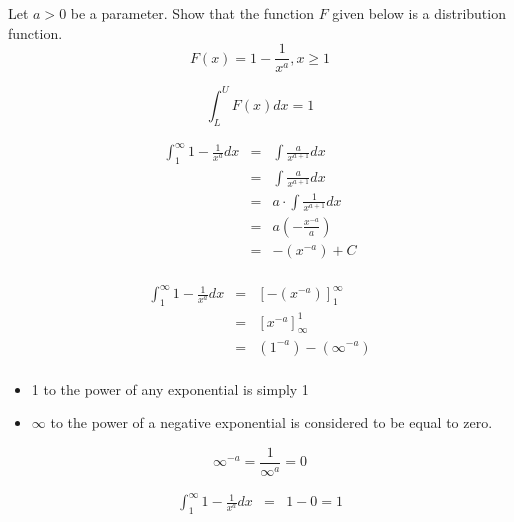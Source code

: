 \documentclass[a4paper,12pt]{article}
\begin{document}
\large

\noindent Let $a > 0$ be a parameter. Show that the function $F$ given below is a distribution function.
\[F( x) = 1 -  \frac{1}{x^a} , x \geq 1\]

\begin{framed}
\[\int^{U}_{L} F(x) dx = 1\]
\end{framed}




\large 
\begin{eqnarray*}
\int^{\infty}_{1} 1 - \frac{1}{x^a} dx &=& \int \frac{a}{x^{a+1}} dx\\
&=&
\int \frac{a}{x^{a+1}}dx\\
&=&a\cdot \int \frac{1}{x^{a+1}}dx\\
&=&a\left(-\frac{x^{-a}}{a}\right)\\
&=&-\left(x^{-a}\right)+C\\
\end{eqnarray*}
\large 

\begin{eqnarray*}
\int^{\infty}_{1} 1 - \frac{1}{x^a} dx  &=& \left[-\left(x^{-a}\right)\right]^{\infty}_{1} \\
&=& \left[x^{-a}\right]^{1}_{\infty} \\
&=& \left(1^{-a}\right) - \left(\infty^{-a}\right) \\
\end{eqnarray*}
\newpage 

\begin{itemize}
    \item 1 to the power of any exponential is simply 1
    \item $\infty$ to the power of a negative exponential is considered to be equal to zero.
    
    
\end{itemize}
\[ \infty^{-a} = \frac{1}{\infty^{a}} = 0 \]

\begin{eqnarray*}
\int^{\infty}_{1} 1 - \frac{1}{x^a} dx &=& 1 -0  = 1
\end{eqnarray*}
\end{document}
